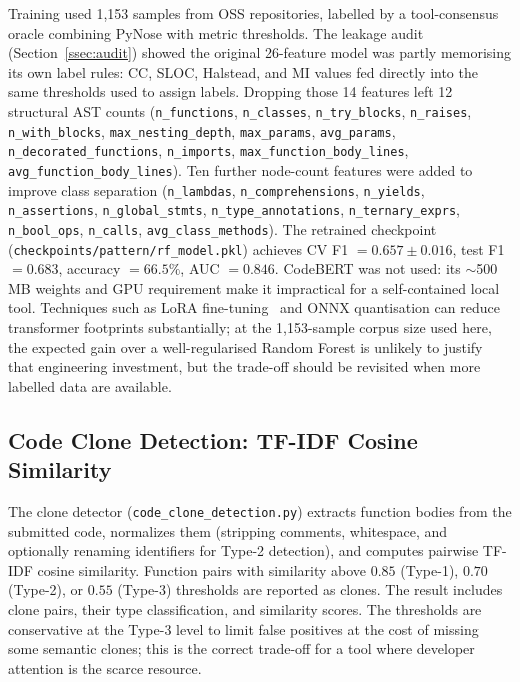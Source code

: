 \documentclass[12pt, oneside]{report}
\begin{document}
Training used 1,153 samples from OSS repositories, labelled by a tool-consensus oracle combining PyNose with metric thresholds. The leakage audit (Section~\ref{ssec:audit}) showed the original 26-feature model was partly memorising its own label rules: CC, SLOC, Halstead, and MI values fed directly into the same thresholds used to assign labels. Dropping those 14 features left 12 structural AST counts (\texttt{n\_functions}, \texttt{n\_classes}, \texttt{n\_try\_blocks}, \texttt{n\_raises}, \texttt{n\_with\_blocks}, \texttt{max\_nesting\_depth}, \texttt{max\_params}, \texttt{avg\_params}, \texttt{n\_decorated\_functions}, \texttt{n\_imports}, \texttt{max\_function\_body\_lines}, \texttt{avg\_function\_body\_lines}). Ten further node-count features were added to improve class separation (\texttt{n\_lambdas}, \texttt{n\_comprehensions}, \texttt{n\_yields}, \texttt{n\_assertions}, \texttt{n\_global\_stmts}, \texttt{n\_type\_annotations}, \texttt{n\_ternary\_exprs}, \texttt{n\_bool\_ops}, \texttt{n\_calls}, \texttt{avg\_class\_methods}). The retrained checkpoint (\texttt{checkpoints/pattern/rf\_model.pkl}) achieves CV F1 $= 0.657 \pm 0.016$, test F1 $= 0.683$, accuracy $= 66.5\%$, AUC $= 0.846$. CodeBERT was not used: its $\sim$500\,MB weights and GPU requirement make it impractical for a self-contained local tool.
Techniques such as LoRA fine-tuning~\cite{hu2022} and ONNX quantisation can reduce
transformer footprints substantially; at the 1,153-sample corpus size used here, the
expected gain over a well-regularised Random Forest is unlikely to justify that
engineering investment, but the trade-off should be revisited when more labelled data
are available.

\subsection{Code Clone Detection: TF-IDF Cosine Similarity}
\label{ssec:clones}

The clone detector (\texttt{code\_clone\_detection.py}) extracts function bodies from the
submitted code, normalizes them (stripping comments, whitespace, and optionally renaming
identifiers for Type-2 detection), and computes pairwise TF-IDF cosine similarity.
Function pairs with similarity above $0.85$ (Type-1), $0.70$ (Type-2), or $0.55$ (Type-3)
thresholds are reported as clones. The result includes clone pairs, their type
classification, and similarity scores. The thresholds are conservative at the Type-3
level to limit false positives at the cost of missing some semantic clones; this is the
correct trade-off for a tool where developer attention is the scarce resource.
\end{document}
